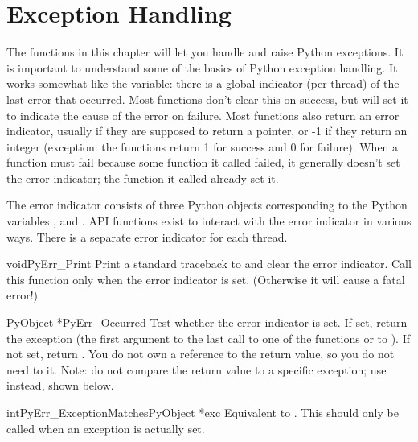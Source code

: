 \documentclass[twoside,openright]{report}
\begin{document}
\chapter{Exception Handling}

The functions in this chapter will let you handle and raise Python
exceptions.  It is important to understand some of the basics of
Python exception handling.  It works somewhat like the \UNIX{}
 variable: there is a global indicator (per thread) of the
last error that occurred.  Most functions don't clear this on success,
but will set it to indicate the cause of the error on failure.  Most
functions also return an error indicator, usually \NULL{} if they are
supposed to return a pointer, or -1 if they return an integer
(exception: the  functions return 1 for success and
0 for failure).  When a function must fail because some function it
called failed, it generally doesn't set the error indicator; the
function it called already set it.

The error indicator consists of three Python objects corresponding to
the Python variables ,  and
.  API functions exist to interact with the
error indicator in various ways.  There is a separate error indicator
for each thread.


\begin{cfuncdesc}{void}{PyErr_Print}{}
Print a standard traceback to  and clear the error
indicator.  Call this function only when the error indicator is set.
(Otherwise it will cause a fatal error!)
\end{cfuncdesc}

\begin{cfuncdesc}{PyObject *}{PyErr_Occurred}{}
Test whether the error indicator is set.  If set, return the exception
 (the first argument to the last call to one of the
 functions or to ).  If not
set, return \NULL{}.  You do not own a reference to the return value,
so you do not need to  it.  Note: do not compare the
return value to a specific exception; use
 instead, shown below.
\end{cfuncdesc}

\begin{cfuncdesc}{int}{PyErr_ExceptionMatches}{PyObject *exc}
Equivalent to
.
This should only be called when an exception is actually set.
\end{cfuncdesc}
\end{document}

